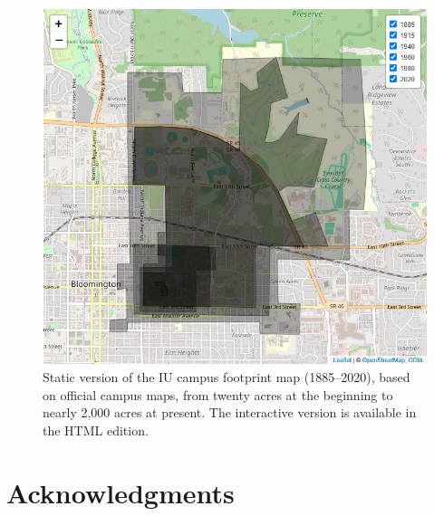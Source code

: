 \documentclass[
  american,
  letterpaper,
]{scrreprt}
\begin{document}
\begin{figure}[H]

{\centering \includegraphics[width=0.85\linewidth,height=\textheight,keepaspectratio]{images/imap.PNG}

}

\caption[Static version of the IU campus footprint map
(1885--2020)]{Static version of the IU campus footprint map
(1885--2020), based on official campus maps, from twenty acres at the
beginning to nearly 2,000 acres at present. The interactive version is
available in the HTML edition.}

\end{figure}%


\chapter*{Acknowledgments}\label{acknowledgments}

\end{document}
